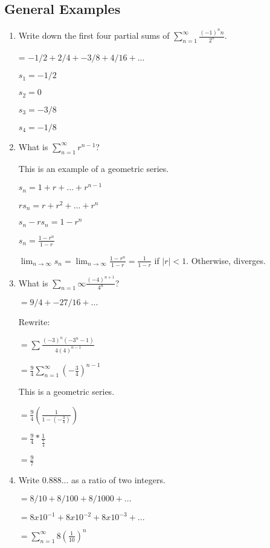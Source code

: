 \documentclass{article}
\begin{document}
\subsection{General Examples}
\begin{enumerate}
    \item Write down the first four partial sums of $\sum_{n=1}^{\infty} \frac{(-1)^n n}{2^n}$.
    
    = $-1/2 + 2/4 + -3/8 + 4/16+...$
    
    $s_1 = -1/2$
    
    $s_2=0$
    
    $s_3 = -3/8$
    
    $s_4 = -1/8$
    
    
    \item What is $\sum_{n=1}^{\infty}r^{n-1}$?
    
    This is an example of a geometric series.
    
    $s_n = 1+r+...+r^{n-1}$
    
    $rs_n = r+r^2+...+r^n$
    
    $s_n-rs_n = 1-r^n$
    
    $s_n = \frac{1-r^n}{1-r}$
    
    $\lim_{n\to\infty}s_n = \lim_{n\to\infty}\frac{1-r^n}{1-r} = \frac{1}{1-r}$ if $|r| < 1$. Otherwise, diverges.
    
    \item What is $\sum_{n=1}{\infty} \frac{(-4)^{n+1}}{4^n}$?
    
    $=9/4 + -27/16+...$
    
    Rewrite:
    
    $=\sum \frac{(-3)^n(-3^n-1)}{4(4)^{n-1}}$
    
    $=\frac{9}{4}\sum_{n=1}^{\infty} (-\frac{3}{4})^{n-1}$
    
    This is a geometric series.
    
    $=\frac{9}{4}(\frac{1}{1-(-\frac{3}{4})})$
    
    $=\frac{9}{4}*\frac{1}{\frac{7}{4}}$
    
    $=\frac{9}{7}$
    
    \item Write $0.888...$ as a ratio of two integers.
    
    $ = 8/10 + 8/100 + 8/1000 + ...$
    
    $ = 8x10^{-1} + 8x10^{-2} + 8x10^{-3} + ...$
    
    $ = \sum_{n=1}^{\infty} 8(\frac{1}{10})^n$
    

\end{enumerate}
\end{document}

